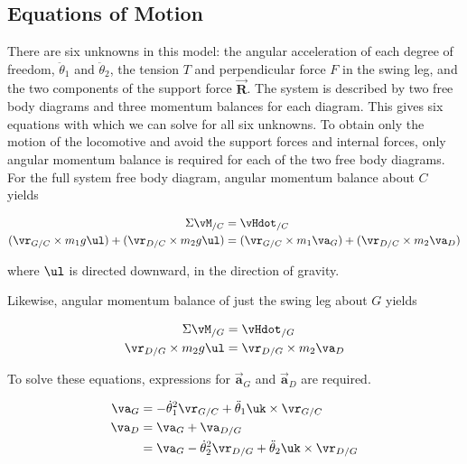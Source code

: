 \subsection*{Equations of Motion}
\label{sec:SimplestWalkerSystemDescription}

There are six unknowns in this model: the angular acceleration of each degree
of freedom, $\ddot{\theta}_{1}$ and $\ddot{\theta}_{2}$, the tension $T$ and
perpendicular force $F$ in the swing leg, and the two components of the support
force $\vec{\mathbf{R}}$. The system is described by two free body diagrams and
three momentum balances for each diagram. This gives six equations with which
we can solve for all six unknowns. To obtain only the motion of the locomotive
and avoid the support forces and internal forces, only angular momentum balance
is required for each of the two free body diagrams. For the full system free
body diagram, angular momentum balance about $C$ yields

\begin{align}
\Sigma \vM_{/C} &= \vHdot_{/C} \notag \\
(\vr_{G/C} \times m_{1} g  \ul ) + (\vr_{D/C} \times m_{2} g  \ul ) &= (\vr_{G/C} \times m_{1} \va_{G}) + (\vr_{D/C} \times m_{2} \va_{D})
\label{eq:SimplestWalkerAMB1}
\end{align}

where $ \ul $ is directed downward, in the direction of gravity.

Likewise, angular momentum balance of just the swing leg about $G$ yields

\begin{align}
\Sigma \vM_{/G} &= \vHdot_{/G} \notag \\
\vr_{D/G} \times m_{2} g  \ul  &= \vr_{D/G} \times m_{2} \va_{D}
\label{eq:SimplestWalkerAMB2}
\end{align}

To solve these equations, expressions for $\vec{\mathbf{a}}_{G}$ and $\vec{\mathbf{a}}_{D}$ are required.

\begin{align}
\va_{G} &= -\dot{\theta}_{1}^{2} \vr_{G/C} + \ddot{\theta}_{1} \uk \times \vr_{G/C} \\
\va_{D}  &= \va_{G} + \va_{D/G} \notag \\
 &= \va_{G}  -\dot{\theta}_{2}^{2} \vr_{D/G} + \ddot{\theta}_{2} \uk \times \vr_{D/G}
\end{align}

